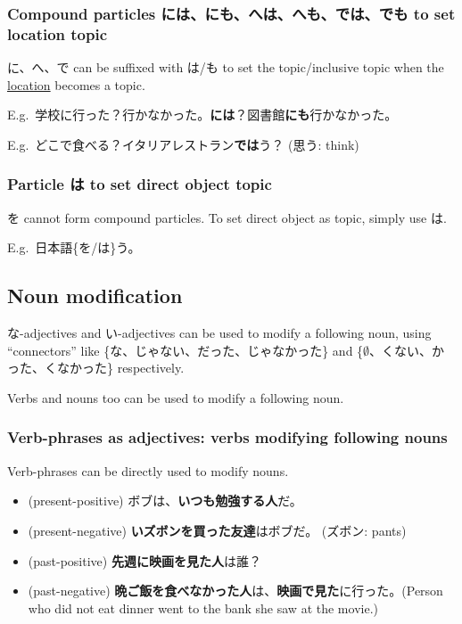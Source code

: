 \documentclass[../nihongo-gakushuu-kyouzai.tex]{subfiles}
\begin{document}
\subsubsection{Compound particles には、にも、へは、へも、では、でも to set location topic}
に、へ、で can be suffixed with は/も to set the topic/inclusive topic when the \ul{location} becomes a topic.

E.g.\ 学校に行った？行かなかった。\textbf{には}？図書館\textbf{にも}行かなかった。

E.g.\ どこで食べる？イタリアレストラン\textbf{では}う？ (思う: think)

\subsubsection{Particle は to set direct object topic}
を cannot form compound particles. To set direct object as topic, simply use は.

E.g.\ 日本語\{を/は\}う。

\subsection{Noun modification}
な-adjectives and い-adjectives can be used to modify a following noun, using ``connectors'' like \{な、じゃない、だった、じゃなかった\} and \{$\emptyset$、くない、かった、くなかった\} respectively.

Verbs and nouns too can be used to modify a following noun.

\subsubsection{Verb-phrases as adjectives: verbs modifying following nouns}
Verb-phrases can be directly used to modify nouns.
\begin{itemize}
    \item (present-positive) ボブは、\textbf{いつも勉強する人}だ。
    \item (present-negative) \textbf{いズボンを買った友達}はボブだ。 (ズボン: pants)
    \item (past-positive) \textbf{先週に映画を見た人}は誰？
    \item (past-negative) \textbf{晩ご飯を食べなかった人}は、\textbf{映画で見た}に行った。(Person who did not eat dinner went to the bank she saw at the movie.)
\end{itemize}
\end{document}
